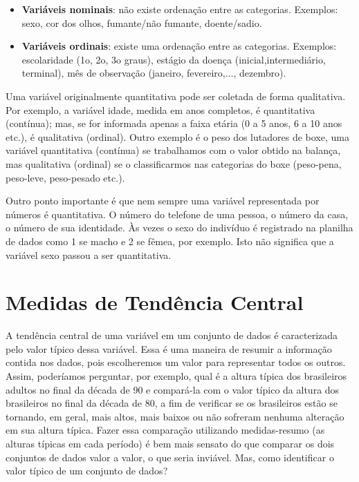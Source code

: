 \documentclass[
]{book}
\providecommand{\tightlist}{%
  \setlength{\itemsep}{0pt}\setlength{\parskip}{0pt}}
\begin{document}
\begin{itemize}
\tightlist
\item
  \textbf{Variáveis nominais}: não existe ordenação entre as categorias. Exemplos: sexo, cor dos olhos, fumante/não fumante, doente/sadio.
\item
  \textbf{Variáveis ordinais}: existe uma ordenação entre as categorias. Exemplos: escolaridade (1o, 2o, 3o graus), estágio da doença (inicial,intermediário, terminal), mês de observação (janeiro, fevereiro,\(\ldots\), dezembro).
\end{itemize}

Uma variável originalmente quantitativa pode ser coletada de forma qualitativa. Por exemplo, a variável idade, medida em anos completos, é quantitativa (contínua); mas, se for informada apenas a faixa etária (0 a 5 anos, 6 a 10 anos etc.), é qualitativa (ordinal). Outro exemplo é o peso dos lutadores de boxe, uma variável quantitativa (contínua) se trabalhamos com o valor obtido na balança, mas qualitativa (ordinal) se o classificarmos nas categorias do boxe (peso-pena, peso-leve, peso-pesado etc.).

Outro ponto importante é que nem sempre uma variável representada por números é quantitativa. O número do telefone de uma pessoa, o número da casa, o número de sua identidade. Às vezes o sexo do indivíduo é registrado na planilha de dados como 1 se macho e 2 se fêmea, por exemplo. Isto não significa que a variável sexo passou a ser quantitativa.

\hypertarget{medidas-de-tenduxeancia-central}{%
\section{Medidas de Tendência Central}\label{medidas-de-tenduxeancia-central}}

A tendência central de uma variável em um conjunto de dados é caracterizada pelo valor típico dessa variável. Essa é uma maneira de resumir a informação contida nos dados, pois escolheremos um valor para representar todos os outros. Assim, poderíamos perguntar, por exemplo, qual é a altura típica dos brasileiros adultos no final da década de 90 e compará-la com o valor típico da altura dos brasileiros no final da década de 80, a fim de verificar se os brasileiros estão se tornando, em geral, mais altos, mais baixos ou não sofreram nenhuma alteração em sua altura típica. Fazer essa comparação utilizando medidas-resumo (as alturas típicas em cada período) é bem mais sensato do que comparar os dois conjuntos de dados valor a valor, o que seria inviável. Mas, como identificar o valor típico de um conjunto de dados?
\end{document}
